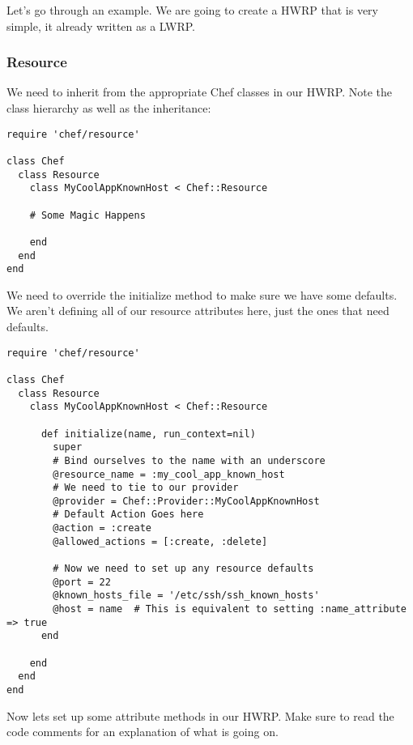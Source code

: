 Let's go through an example. We are going to create a HWRP that is very simple, it already written as a LWRP.

\subsubsection{Resource}

We need to inherit from the appropriate Chef classes in our HWRP. Note the class hierarchy as well as the inheritance:

\begin{lstlisting}[label=lst:cookbook-hwrp2]
require 'chef/resource'

class Chef
  class Resource
    class MyCoolAppKnownHost < Chef::Resource

    # Some Magic Happens

    end
  end
end
\end{lstlisting}

We need to override the initialize method to make sure we have some defaults. We aren't defining all of our resource attributes here, just the ones that need defaults.

\begin{lstlisting}[label=lst:cookbook-hwrp3]
require 'chef/resource'

class Chef
  class Resource
    class MyCoolAppKnownHost < Chef::Resource

      def initialize(name, run_context=nil)
        super
        # Bind ourselves to the name with an underscore
        @resource_name = :my_cool_app_known_host
        # We need to tie to our provider
        @provider = Chef::Provider::MyCoolAppKnownHost
        # Default Action Goes here
        @action = :create
        @allowed_actions = [:create, :delete]

        # Now we need to set up any resource defaults
        @port = 22
        @known_hosts_file = '/etc/ssh/ssh_known_hosts'
        @host = name  # This is equivalent to setting :name_attribute => true
      end

    end
  end
end
\end{lstlisting}

Now lets set up some attribute methods in our HWRP. Make sure to read the code comments for an explanation of what is going on.

